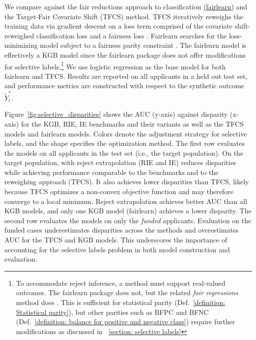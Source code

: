 \documentclass{article}
\begin{document}
We compare against the fair reductions approach to classification \href{https://fairlearn.github.io/v0.5.0/api_reference/fairlearn.reductions.html}{(fairlearn)} and the Target-Fair Covariate Shift (TFCS) method. 
TFCS iteratively reweighs the training data via gradient descent on a loss term comprised of the covariate shift-reweighed classification loss and a fairness loss \cite{coston2019fair}.
Fairlearn searches for the loss-minimizing model subject to a fairness parity constraint \cite{agarwal2018reductions}. The fairlearn model is effectively a KGB model since the fairlearn package does not offer modifications for selective labels.\footnote{To accommodate reject inference, a method must support real-valued outcomes. The fairlearn package does not, but the related \emph{fair regressions} method does \cite{AgarwalEtAl(19)-FairRegression}. This is sufficient for statistical parity (Def.~\ref{definition: Statistical parity}), but other parities such as BFPC and BFNC (Def.~\ref{definition: balance for positive and negative class}) require further modifications as discussed in \textsection~\ref{section: selective labels}} We use logistic regression as the base model for both fairlearn and TFCS.
Results are reported on all applicants in a held out test set, and performance metrics are constructed with respect to the synthetic outcome $\tilde Y_i^*$. 

Figure~\ref{fig:selective_disparities} shows the AUC (y-axis) against disparity (x-axis) for the KGB, RIE, IE benchmarks and their \fairs variants as well as the
TFCS models and fairlearn models.
Colors denote the adjustment strategy for selective labels, and the shape specifies the optimization method.
The first row evaluates the models on all applicants in the test set (i.e., the target population).
On the target population, \fairs with reject extrapolation (RIE and IE) reduces disparities while achieving performance comparable to the benchmarks and to the reweighing approach (TFCS). 
It also achieves lower disparities than TFCS, likely because TFCS optimizes a non-convex objective function and may therefore converge to a local minimum. Reject extrapolation achieves better AUC than all KGB models, and only one KGB model (fairlearn) achieves a lower disparity.
The second row evaluates the models on only the \emph{funded} applicants. Evaluation on the funded cases underestimates disparities across the methods and overestimates AUC for the TFCS and KGB models. This underscores the importance of accounting for the selective labels problem in both model construction and evaluation.
\end{document}
